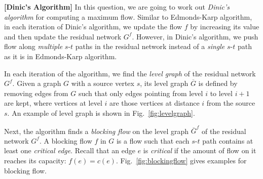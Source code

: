 \documentclass{oxmathproblems}
\begin{document}
\begin{questions}

\miquestion[Bonus 60]
\textbf{[Dinic's Algorithm]}
In this question, we are going to work out \emph{Dinic's algorithm} for computing a maximum flow.
Similar to Edmonds-Karp algorithm, in each iteration of Dinic's algorithm, we update the flow $f$ by increasing its value and then update the residual network $G^f$.
However, in Dinic's algorithm, we push flow along \emph{multiple} $s$-$t$ paths in the residual network instead of a \emph{single} $s$-$t$ path as it is in Edmonds-Karp algorithm.

In each iteration of the algorithm, we find the \emph{level graph} of the residual network $G^f$.
Given a graph $G$ with a source vertex $s$, its level graph $\overline{G}$ is defined by removing edges from $G$ such that only edges pointing from level $i$ to level $i+1$ are kept, where vertices at level $i$ are those vertices at distance $i$ from the source $s$.
An example of level graph is shown in Fig.~\ref{fig:levelgraph}.

Next, the algorithm finds a \emph{blocking flow} on the level graph $\overline{G}^f$ of the residual network $G^f$.
A blocking flow $f$ in $G$ is a flow such that each $s$-$t$ path contains at least one \emph{critical edge}.
Recall that an edge $e$ is \emph{critical} if the amount of flow on it reaches its capacity: $f(e)=c(e)$.
Fig.~\ref{fig:blockingflow} gives examples for blocking flow.


\end{questions}
\end{document}
